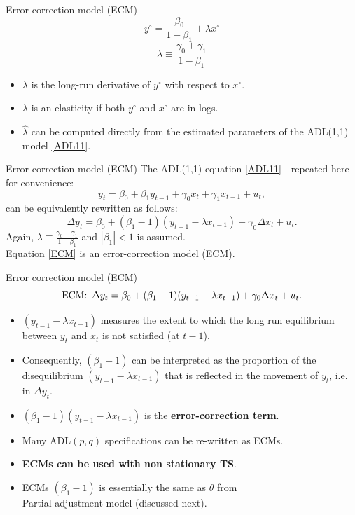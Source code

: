 \documentclass{beamer}
\begin{document}
\begin{frame}{Error correction model (ECM)}
$$ y^{\circ} =  \frac{\beta_0}{1 - \beta_1} + \lambda x^{\circ}$$
$$ \lambda \equiv \frac{\gamma_0 + \gamma_1}{1 - \beta_1}$$
\begin{itemize}
\item $\lambda$ is the long-run derivative of $y^{\circ}$ with respect to $x^{\circ}$.
\medskip
\item $\lambda$ is an elasticity if both $y^{\circ}$ and $x^{\circ}$ are in logs.
\medskip
\item $\hat{\lambda}$ can be computed directly from the estimated parameters of the ADL(1,1) model \eqref{ADL11}.
\end{itemize}
\end{frame}
\begin{frame}{Error correction model (ECM)}
The ADL(1,1) equation \eqref{ADL11} - repeated here for convenience:
\begin{equation*}
y_t = \beta_0 + \beta_1 y_{t-1} + 
         \gamma_0 x_t + \gamma_1 x_{t-1} + u_t,
\end{equation*}
can be equivalently rewritten as follows:
\begin{equation} \label{ECM}
\Delta y_t = \beta_0 + (\beta_1 -1) ( y_{t-1} - \lambda x_{t-1} ) + 
         \gamma_0 \Delta x_t + u_t.
\end{equation}
Again, $ \lambda \equiv \frac{\gamma_0 + \gamma_1}{1 - \beta_1}$ and $|\beta_1| < 1$ is assumed. \\
\medskip
Equation \eqref{ECM} is an error-correction model (ECM).
\end{frame}
\begin{frame}{Error correction model (ECM)}
\begin{equation*} 
\textnormal{ECM:} \, \, \, \Delta y_t = \beta_0 + (\beta_1 -1) ( y_{t-1} - \lambda x_{t-1} ) + 
         \gamma_0 \Delta x_t + u_t.
\end{equation*}

\begin{itemize}
\item $( y_{t-1} - \lambda x_{t-1} )$ measures the extent to which the long run equilibrium between $y_t$ and $x_t$ is not satisfied (at $t-1$).
\item Consequently, $(\beta_1 -1)$ can be interpreted as the proportion of the disequilibrium $( y_{t-1} - \lambda x_{t-1} )$ that is reflected in the movement of $y_t$, i.e. in $\Delta y_t$.
\item $(\beta_1 -1)( y_{t-1} - \lambda x_{t-1} )$ is the \textbf{error-correction term}.
\item Many ADL$(p,q)$ specifications can be re-written as ECMs.
\item \textbf{ECMs can be used with non stationary TS}.
\item ECMs $(\beta_1 -1)$ is essentially the same as $\theta$ from \\Partial adjustment model (discussed next).
\end{itemize}
\end{frame}
\end{document}
